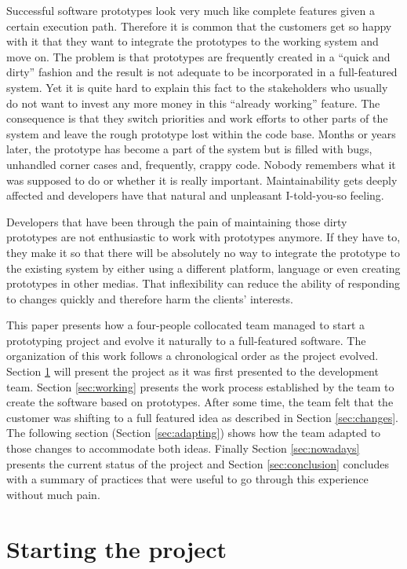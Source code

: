 \documentclass[lnbip]{svmultln}
\begin{document}
Successful software prototypes look very much like complete features
given a certain execution path. Therefore it is common that the
customers get so happy with it that they want to integrate the
prototypes to the working system and move on. The problem is that
prototypes are frequently created in a ``quick and dirty'' fashion and
the result is not adequate to be incorporated in a full-featured
system. Yet it is quite hard to explain this fact to the stakeholders
who usually do not want to invest any more money in this ``already
working'' feature. The consequence is that they switch priorities and
work efforts to other parts of the system and leave the rough
prototype lost within the code base. Months or years later, the
prototype has become a part of the system but is filled with bugs,
unhandled corner cases and, frequently, crappy code. Nobody remembers
what it was supposed to do or whether it is really
important. Maintainability gets deeply affected and developers have
that natural and unpleasant I-told-you-so feeling. %

Developers that have been through the pain of maintaining those dirty
prototypes are not enthusiastic to work with prototypes anymore. If
they have to, they make it so that there will be absolutely no way to
integrate the prototype to the existing system by either using a
different platform, language or even creating prototypes in other
medias. That inflexibility can reduce the ability of responding to
changes quickly and therefore harm the clients' interests.

This paper presents how a four-people collocated team managed to start
a prototyping project and evolve it naturally to a full-featured
software. The organization of this work follows a chronological order
as the project evolved. Section \ref{sec:start} will present the
project as it was first presented to the development team. Section
\ref{sec:working} presents the work process established by the team to
create the software based on prototypes.  After some time, the team
felt that the customer was shifting to a full featured idea as
described in Section \ref{sec:changes}. The following section (Section
\ref{sec:adapting}) shows how the team adapted to those changes to
accommodate both ideas. Finally Section \ref{sec:nowadays} presents the
current status of the project and Section \ref{sec:conclusion}
concludes with a summary of practices that were useful to go through
this experience without much pain.

\section{Starting the project}
\label{sec:start}
\end{document}

